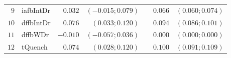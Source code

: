 \begin{table*}[!ht]
\begin{tabular*}{\textwidth}{@{}rlrrrrr@{}}
\footnotesize{$9 $} & \footnotesize{iafbIntDr} & \footnotesize{$0.032$}   & \footnotesize{$(-0.015;0.079)$} && \footnotesize{$0.066$} & \footnotesize{$(0.060;0.074)$} \\
\footnotesize{$10$} & \footnotesize{dffbIntDr} & \footnotesize{$0.076$}   & \footnotesize{$(0.033;0.120)$}  && \footnotesize{$0.094$} & \footnotesize{$(0.086;0.101)$} \\
\footnotesize{$11$} & \footnotesize{dffbWDr  } & \footnotesize{$-0.010$}  & \footnotesize{$(-0.057;0.036)$} && \footnotesize{$0.000$} & \footnotesize{$(0.000;0.000)$} \\
\footnotesize{$12$} & \footnotesize{tQuench  } & \footnotesize{$0.074$}   & \footnotesize{$(0.028;0.120)$}  && \footnotesize{$0.100$} & \footnotesize{$(0.091;0.109)$} \\

\bottomrule
\end{tabular*}
\end{table*}

